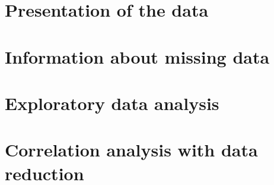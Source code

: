 \documentclass{article}
\begin{document}
\thispagestyle{empty}
\tableofcontents
\listoffigures
\listoftables
\pagebreak
\setcounter{page}{1}

\section{Presentation of the data}


\section{Information about missing data}


\section{Exploratory data analysis}


\section{Correlation analysis with data reduction}

\end{document}
